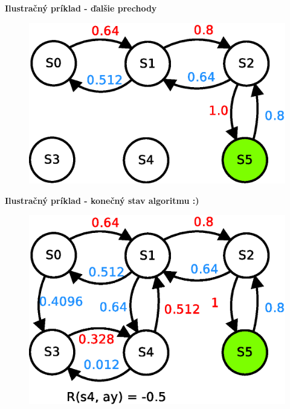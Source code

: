 \documentclass[xcolor=dvipsnames]{beamer}
\begin{document}
\begin{frame}{\bf Ilustračný príklad - ďalšie prechody}

\begin{figure}[!htb]
\includegraphics[scale=.5]{../diagrams/q_learning_table_05.eps}
\end{figure}

\end{frame}

\begin{frame}{\bf Ilustračný príklad - konečný stav algoritmu :)}

\begin{figure}[!htb]
\includegraphics[scale=.5]{../diagrams/q_learning_table_06.eps}
\end{figure}

\end{frame}
\end{document}
